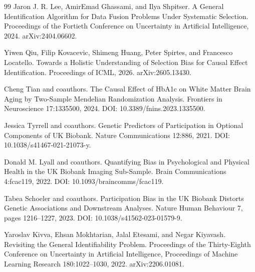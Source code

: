 \documentclass{article}
\begin{document}
\begin{thebibliography}{99}
   Jaron J. R. Lee, AmirEmad Ghassami, and Ilya Shpitser. A General Identification Algorithm for Data Fusion Problems Under Systematic Selection. Proceedings of the Fortieth Conference on Uncertainty in Artificial Intelligence, 2024. arXiv:2404.06602.

   Yiwen Qiu, Filip Kovacevic, Shimeng Huang, Peter Spirtes, and Francesco Locatello. Towards a Holistic Understanding of Selection Bias for Causal Effect Identification. Proceedings of ICML, 2026. arXiv:2605.13430.

   Cheng Tian and coauthors. The Causal Effect of HbA1c on White Matter Brain Aging by Two-Sample Mendelian Randomization Analysis. Frontiers in Neuroscience 17:1335500, 2024. DOI: 10.3389/fnins.2023.1335500.

   Jessica Tyrrell and coauthors. Genetic Predictors of Participation in Optional Components of UK Biobank. Nature Communications 12:886, 2021. DOI: 10.1038/s41467-021-21073-y.

   Donald M. Lyall and coauthors. Quantifying Bias in Psychological and Physical Health in the UK Biobank Imaging Sub-Sample. Brain Communications 4:fcac119, 2022. DOI: 10.1093/braincomms/fcac119.

   Tabea Schoeler and coauthors. Participation Bias in the UK Biobank Distorts Genetic Associations and Downstream Analyses. Nature Human Behaviour 7, pages 1216--1227, 2023. DOI: 10.1038/s41562-023-01579-9.

   Yaroslav Kivva, Ehsan Mokhtarian, Jalal Etesami, and Negar Kiyavash. Revisiting the General Identifiability Problem. Proceedings of the Thirty-Eighth Conference on Uncertainty in Artificial Intelligence, Proceedings of Machine Learning Research 180:1022--1030, 2022. arXiv:2206.01081.

\end{thebibliography}
\end{document}
